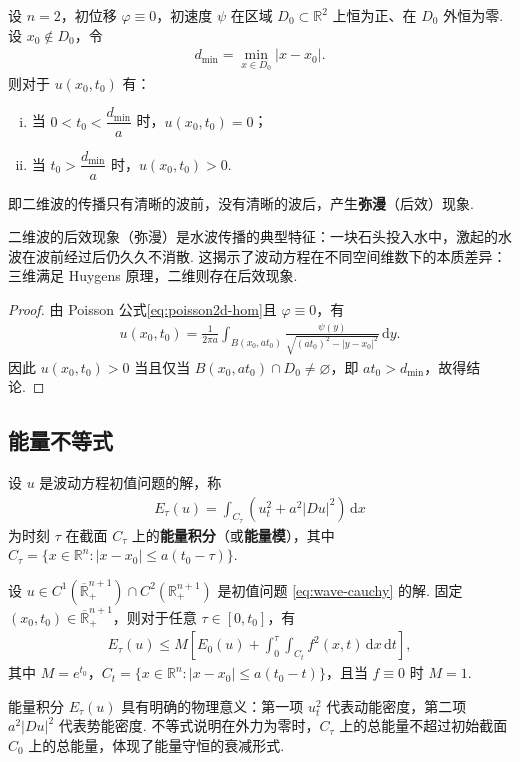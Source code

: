 \documentclass[../../main.tex]{subfiles}%
\begin{document}
\begin{proposition}[二维波的弥漫]
设 $n=2$，初位移 $\varphi\equiv 0$，初速度 $\psi$ 在区域 $D_0\subset\mathbb{R}^2$ 上恒为正、在 $D_0$ 外恒为零. 设 $x_0\notin D_0$，令
\begin{align*}
d_{\min}=\min_{x\in D_0}|x-x_0|.
\end{align*}
则对于 $u(x_0,t_0)$ 有：
\begin{enumerate}[(i)]
\item 当 $0<t_0<\dfrac{d_{\min}}{a}$ 时，$u(x_0,t_0)=0$；
\item 当 $t_0>\dfrac{d_{\min}}{a}$ 时，$u(x_0,t_0)>0$.
\end{enumerate}
即二维波的传播只有清晰的波前，没有清晰的波后，产生\textbf{弥漫}（后效）现象.
\end{proposition}
\begin{remark}
二维波的后效现象（弥漫）是水波传播的典型特征：一块石头投入水中，激起的水波在波前经过后仍久久不消散. 这揭示了波动方程在不同空间维数下的本质差异：三维满足 Huygens 原理，二维则存在后效现象.
\end{remark}
\begin{proof}
由 Poisson 公式\eqref{eq:poisson2d-hom}且 $\varphi\equiv 0$，有
\begin{align*}
u(x_0,t_0)=\frac{1}{2\pi a}\int_{B(x_0,at_0)}\frac{\psi(y)}{\sqrt{(at_0)^2-|y-x_0|^2}}\,\mathrm{d}y.
\end{align*}
因此 $u(x_0,t_0)>0$ 当且仅当 $B(x_0,at_0)\cap D_0\neq\varnothing$，即 $at_0>d_{\min}$，故得结论.
\end{proof}


\subsection{能量不等式}

\begin{definition}
设 $u$ 是波动方程初值问题的解，称
\begin{align}
E_\tau(u)=\int_{C_\tau}(u_t^2+a^2|Du|^2)\,\mathrm{d}x \label{eq:energy-integral}
\end{align}
为时刻 $\tau$ 在截面 $C_\tau$ 上的\textbf{能量积分}（或\textbf{能量模}），其中 $C_\tau=\{x\in\mathbb{R}^n: |x-x_0|\leqslant a(t_0-\tau)\}$.
\end{definition}

\begin{theorem}[$n$维能量不等式]
设 $u\in C^1(\overline{\mathbb{R}}^{n+1}_+)\cap C^2(\mathbb{R}^{n+1}_+)$ 是初值问题 \eqref{eq:wave-cauchy} 的解. 固定 $(x_0,t_0)\in\overline{\mathbb{R}}^{n+1}_+$，则对于任意 $\tau\in[0,t_0]$，有
\begin{align}
E_\tau(u)\leqslant M\left[E_0(u)+\int_0^\tau\int_{C_t}f^2(x,t)\,\mathrm{d}x\,\mathrm{d}t\right], \label{eq:energy-ineq-gen}
\end{align}
其中 $M=e^{t_0}$，$C_t=\{x\in\mathbb{R}^n: |x-x_0|\leqslant a(t_0-t)\}$，且当 $f\equiv 0$ 时 $M=1$.
\end{theorem}
\begin{remark}
能量积分 $E_\tau(u)$ 具有明确的物理意义：第一项 $u_t^2$ 代表动能密度，第二项 $a^2|Du|^2$ 代表势能密度. 不等式说明在外力为零时，$C_\tau$ 上的总能量不超过初始截面 $C_0$ 上的总能量，体现了能量守恒的衰减形式.
\end{remark}
\end{document}
